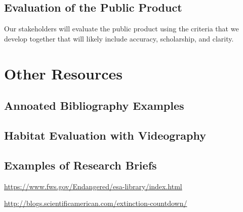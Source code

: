 \documentclass{tufte-handout}\usepackage[]{graphicx}\usepackage[]{color}
\begin{document}
\subsection{Evaluation of the Public Product}

Our stakeholders will evaluate the public product using the criteria that we develop together that will likely include accuracy, scholarship, and clarity. 

\section{Other Resources}

\subsection{Annoated Bibliography Examples}

\subsection{Habitat Evaluation with Videography}

\subsection{Examples of Research Briefs}

\href{https://www.fws.gov/Endangered/esa-library/index.html}{https://www.fws.gov/Endangered/esa-library/index.html}

\href{http://blogs.scientificamerican.com/extinction-countdown/}{http://blogs.scientificamerican.com/extinction-countdown/}
\end{document}
